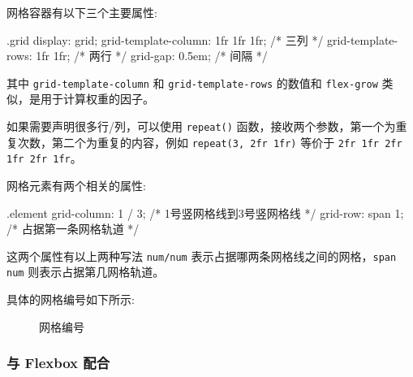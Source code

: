网格容器有以下三个主要属性:

\begin{HTML}
.grid {
    display: grid;
    grid-template-column: 1fr 1fr 1fr;  /* 三列 */
    grid-template-rows: 1fr 1fr;        /* 两行 */
    grid-gap: 0.5em;                    /* 间隔 */
}
\end{HTML}

其中 \texttt{grid-template-column} 和 \texttt{grid-template-rows} 的数值和 \texttt{flex-grow} 类似，是用于计算权重的因子。

如果需要声明很多行/列，可以使用 \texttt{repeat()} 函数，接收两个参数，第一个为重复次数，第二个为重复的内容，例如 \texttt{repeat(3, 2fr 1fr)} 等价于 \texttt{2fr 1fr 2fr 1fr 2fr 1fr}。

网格元素有两个相关的属性:

\begin{HTML}
.element {
    grid-column: 1 / 3;  /* 1号竖网格线到3号竖网格线 */
    grid-row: span 1;    /* 占据第一条网格轨道 */
}
\end{HTML}

这两个属性有以上两种写法 \texttt{num/num} 表示占据哪两条网格线之间的网格，\texttt{span num} 则表示占据第几网格轨道。

具体的网格编号如下所示:

\begin{figure}[H]
    \small
    \centering
    \caption{网格编号}
    \label{fig:网格编号}
\end{figure}

\subsubsection*{与 Flexbox 配合}

